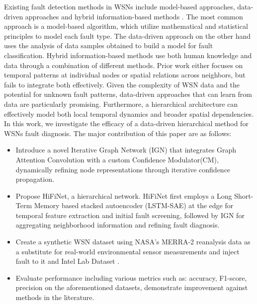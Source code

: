 Existing fault detection methods in WSNs include model-based approaches, data-driven approaches and hybrid information-based methods \cite{Shi2024}. The most common approach is a model-based algorithm, which utilize mathematical and statistical principles to model each fault type. The data-driven approach on the other hand uses the analysis of data samples obtained to build a model for fault classification. Hybrid information-based methods use both human knowledge and data through a combination of different methods. Prior work either focuses on temporal patterns at individual nodes or spatial relations across neighbors, but fails to integrate both effectively. Given the complexity of WSN data and the potential for unknown fault patterns, data-driven approaches that can learn from data are particularly promising. Furthermore, a hierarchical architecture can effectively model both local temporal dynamics and broader spatial dependencies. In this work, we investigate the efficacy of a data-driven hierarchical method for WSNs fault diagnosis. The major contribution of this paper are as follows:

\begin{itemize}
  \item Introduce a novel Iterative Graph Network (IGN) that integrates Graph Attention Convolution with a custom Confidence Modulator(CM), dynamically refining node representations through iterative confidence propagation.
  \item Propose HiFiNet, a hierarchical network. HiFiNet first employs a Long Short-Term Memory based stacked autoencoder (LSTM-SAE) at the edge for temporal feature extraction and initial fault screening, followed by IGN for aggregating neighborhood information and refining fault diagnosis.
  \item Create a synthetic WSN dataset using NASA’s MERRA-2 reanalysis data as a substitute for real-world environmental sensor measurements and inject fault to it and Intel Lab Dataset \cite{Intel2004}.
  \item Evaluate performance including various metrics such as: accuracy, F1-score, precision on the aforementioned datasets, demonstrate improvement against methods in the literature.
\end{itemize}
